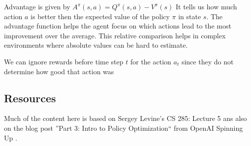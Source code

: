 \begin{enumerate}
\newline Advantage is given by $A^\pi(s,a) = Q^\pi(s,a) - V^\pi(s)$
It tells us how much action $a$ is better then the expected value of the policy 
$\pi$ in state $s$. The advantage function helps the agent focus on which actions lead to the most improvement over the average. This relative comparison helps in complex environments where absolute values can be hard to estimate.

 \newline We can ignore rewards before time step $t$ for  the action $a_t$ since they do not determine how good that action was

\end{enumerate}

\subsection{Resources}
Much of the content here is based on Sergey Levine’s CS 285: Lecture 5 \cite{CS285,CS285LevineYoutube} ans also on the blog post ''Part 3: Intro to Policy Optimization`` from OpenAI Spinning Up \cite{OpenAI_Spinning_UP}.